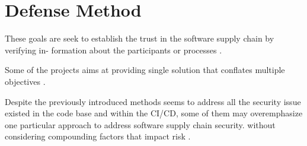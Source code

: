 \section{Defense Method}




These goals are seek to establish the trust in the software supply chain by verifying in-
formation about the participants or processes \cite{melara2022software}.

Some of the projects aims at providing single solution that conﬂates multiple objectives 
\cite{melara2022software}.






Despite the previously introduced methods seems to address all the security issue
existed in the code base and within the CI/CD, some of them may overemphasize one 
particular approach to address software supply chain security. without considering 
compounding factors that impact risk \cite{melara2022software}.